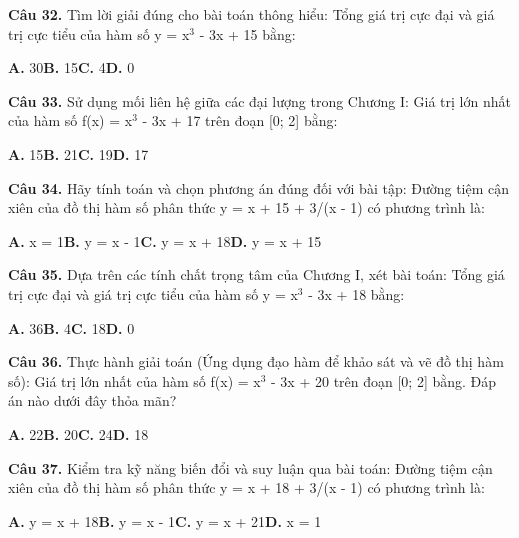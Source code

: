\documentclass[11pt,a4paper]{article}
\begin{document}
\textbf{\color{primary} Câu 32.} Tìm lời giải đúng cho bài toán thông hiểu: Tổng giá trị cực đại và giá trị cực tiểu của hàm số y = x$^3$ - 3x + 15 bằng:\par
\hspace*{1.5em}\textbf{A.} 30\quad\quad \textbf{B.} 15\quad\quad \textbf{C.} 4\quad\quad \textbf{D.} 0\par\vspace{2pt}
\textbf{\color{primary} Câu 33.} Sử dụng mối liên hệ giữa các đại lượng trong Chương I: Giá trị lớn nhất của hàm số f(x) = x$^3$ - 3x + 17 trên đoạn [0; 2] bằng:\par
\hspace*{1.5em}\textbf{A.} 15\quad\quad \textbf{B.} 21\quad\quad \textbf{C.} 19\quad\quad \textbf{D.} 17\par\vspace{2pt}
\textbf{\color{primary} Câu 34.} Hãy tính toán và chọn phương án đúng đối với bài tập: Đường tiệm cận xiên của đồ thị hàm số phân thức y = x + 15 + 3/(x - 1) có phương trình là:\par
\hspace*{1.5em}\textbf{A.} x = 1\quad\quad \textbf{B.} y = x - 1\quad\quad \textbf{C.} y = x + 18\quad\quad \textbf{D.} y = x + 15\par\vspace{2pt}
\textbf{\color{primary} Câu 35.} Dựa trên các tính chất trọng tâm của Chương I, xét bài toán: Tổng giá trị cực đại và giá trị cực tiểu của hàm số y = x$^3$ - 3x + 18 bằng:\par
\hspace*{1.5em}\textbf{A.} 36\quad\quad \textbf{B.} 4\quad\quad \textbf{C.} 18\quad\quad \textbf{D.} 0\par\vspace{2pt}
\textbf{\color{primary} Câu 36.} Thực hành giải toán (Ứng dụng đạo hàm để khảo sát và vẽ đồ thị hàm số): Giá trị lớn nhất của hàm số f(x) = x$^3$ - 3x + 20 trên đoạn [0; 2] bằng. Đáp án nào dưới đây thỏa mãn?\par
\hspace*{1.5em}\textbf{A.} 22\quad\quad \textbf{B.} 20\quad\quad \textbf{C.} 24\quad\quad \textbf{D.} 18\par\vspace{2pt}
\textbf{\color{primary} Câu 37.} Kiểm tra kỹ năng biến đổi và suy luận qua bài toán: Đường tiệm cận xiên của đồ thị hàm số phân thức y = x + 18 + 3/(x - 1) có phương trình là:\par
\hspace*{1.5em}\textbf{A.} y = x + 18\quad\quad \textbf{B.} y = x - 1\quad\quad \textbf{C.} y = x + 21\quad\quad \textbf{D.} x = 1\par\vspace{2pt}
\end{document}
